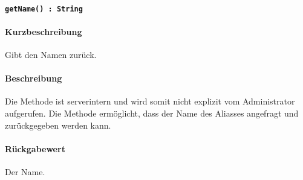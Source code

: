 \paragraph{\texttt{getName() : String}}%
\paragraph*{Kurzbeschreibung}
Gibt den Namen zurück.
\paragraph*{Beschreibung}
Die Methode ist serverintern und wird somit nicht explizit vom Administrator aufgerufen.
Die Methode ermöglicht, dass der Name des Aliasses angefragt und zurückgegeben werden kann.
\paragraph*{Rückgabewert}
Der Name.
